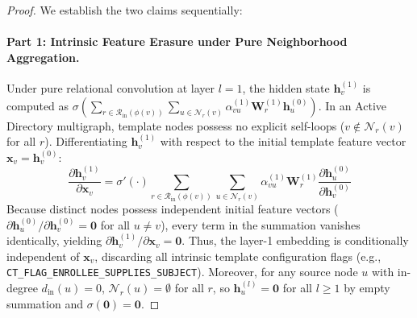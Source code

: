 \begin{proof}
We establish the two claims sequentially:

\paragraph{Part 1: Intrinsic Feature Erasure under Pure Neighborhood Aggregation.}
Under pure relational convolution at layer $l=1$, the hidden state $\mathbf{h}_v^{(1)}$ is computed as $\sigma \left( \sum_{r \in \mathcal{R}_{\text{in}}(\phi(v))} \sum_{u \in \mathcal{N}_r(v)} \alpha_{vu}^{(1)} \mathbf{W}_r^{(1)} \mathbf{h}_u^{(0)} \right)$. In an Active Directory multigraph, template nodes possess no explicit self-loops ($v \notin \mathcal{N}_r(v)$ for all $r$). Differentiating $\mathbf{h}_v^{(1)}$ with respect to the initial template feature vector $\mathbf{x}_v = \mathbf{h}_v^{(0)}$:
\begin{equation}
\frac{\partial \mathbf{h}_v^{(1)}}{\partial \mathbf{x}_v} = \sigma'(\cdot) \sum_{r \in \mathcal{R}_{\text{in}}(\phi(v))} \sum_{u \in \mathcal{N}_r(v)} \alpha_{vu}^{(1)} \mathbf{W}_r^{(1)} \frac{\partial \mathbf{h}_u^{(0)}}{\partial \mathbf{h}_v^{(0)}}
\end{equation}
Because distinct nodes possess independent initial feature vectors ($\partial \mathbf{h}_u^{(0)} / \partial \mathbf{h}_v^{(0)} = \mathbf{0}$ for all $u \neq v$), every term in the summation vanishes identically, yielding $\partial \mathbf{h}_v^{(1)} / \partial \mathbf{x}_v = \mathbf{0}$. Thus, the layer-1 embedding is conditionally independent of $\mathbf{x}_v$, discarding all intrinsic template configuration flags (e.g., \texttt{CT\_FLAG\_ENROLLEE\_SUPPLIES\_SUBJECT}). Moreover, for any source node $u$ with in-degree $d_{\text{in}}(u) = 0$, $\mathcal{N}_r(u) = \emptyset$ for all $r$, so $\mathbf{h}_u^{(l)} = \mathbf{0}$ for all $l \ge 1$ by empty summation and $\sigma(\mathbf{0}) = \mathbf{0}$.


\end{proof}
